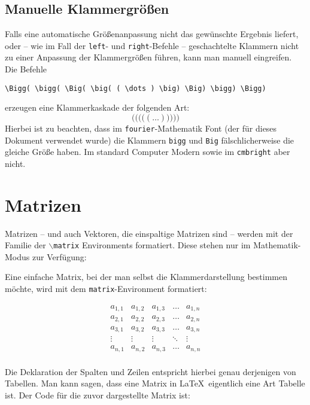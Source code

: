 \subsection{Manuelle Klammergrößen}

Falls eine automatische Größenanpassung nicht das gewünschte Ergebnis liefert, oder -- wie im Fall der \texttt{left}- und \texttt{right}-Befehle -- geschachtelte Klammern nicht zu einer Anpassung der Klammergrößen führen, kann man manuell eingreifen. Die Befehle 
\begin{verbatim}
\Bigg( \bigg( \Big( \big( ( \dots ) \big) \Big) \bigg) \Bigg)
\end{verbatim}
erzeugen eine Klammerkaskade der folgenden Art:
\begin{equation*}
\Bigg( \bigg( \Big( \big( ( \dots ) \big) \Big) \bigg) \Bigg)
\end{equation*}
Hierbei ist zu beachten, dass im \texttt{fourier}-Mathematik Font (der für dieses Dokument verwendet wurde) die Klammern \texttt{bigg} und \texttt{Big} fälschlicherweise die gleiche Größe haben. Im standard Computer Modern sowie im \texttt{cmbright} aber nicht. 

\section{Matrizen}

Matrizen -- und auch Vektoren, die einspaltige Matrizen sind -- werden mit der Familie der  \texttt{$\backslash$matrix} Environments formatiert. Diese stehen nur im Mathematik-Modus zur Verfügung:

Eine einfache Matrix, bei der man selbst die Klammerdarstellung bestimmen möchte, wird mit dem \texttt{matrix}-Environment formatiert:

\begin{equation*}
\begin{matrix}
a_{1,1} & a_{1,2} & a_{1,3} & \dots & a_{1,n} \\
a_{2,1} & a_{2,2} & a_{2,3} & \dots & a_{2,n} \\
a_{3,1} & a_{3,2} & a_{3,3} & \dots & a_{3,n} \\
\vdots & \vdots & \vdots & \ddots & \vdots \\
a_{n,1} & a_{n,2} & a_{n,3} & \dots & a_{n,n} \\
\end{matrix}
\end{equation*}

Die Deklaration der Spalten und Zeilen entspricht hierbei genau derjenigen von Tabellen. Man kann sagen, dass eine Matrix in \LaTeX\ eigentlich eine Art Tabelle ist. Der Code für die zuvor dargestellte Matrix ist:

